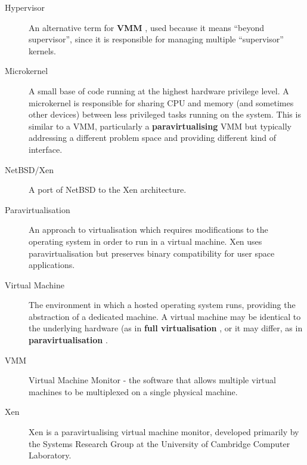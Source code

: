 \documentclass[11pt,twoside,final,openright]{xenstyle}
\begin{document}
{\begin{description}
\item[Hypervisor]          An alternative term for { \bf VMM }, used
                           because it means ``beyond supervisor'',
                           since it is responsible for managing multiple
                           ``supervisor'' kernels.

\item[Microkernel]         A small base of code running at the highest
                           hardware privilege level.  A microkernel is
                           responsible for sharing CPU and memory (and
                           sometimes other devices) between less
                           privileged tasks running on the system.
                           This is similar to a VMM, particularly a
                           {\bf paravirtualising} VMM but typically
                           addressing a different problem space and
                           providing different kind of interface.

\item[NetBSD/Xen]          A port of NetBSD to the Xen architecture.

\item[Paravirtualisation]  An approach to virtualisation which requires
                           modifications to the operating system in
                           order to run in a virtual machine.  Xen
                           uses paravirtualisation but preserves
                           binary compatibility for user space
                           applications.

\item[Virtual Machine]     The environment in which a hosted operating
                           system runs, providing the abstraction of a
                           dedicated machine.  A virtual machine may
                           be identical to the underlying hardware (as
                           in { \bf full virtualisation }, or it may
                           differ, as in { \bf paravirtualisation }.

\item[VMM]                 Virtual Machine Monitor - the software that
                           allows multiple virtual machines to be
                           multiplexed on a single physical machine.

\item[Xen]                 Xen is a paravirtualising virtual machine
                           monitor, developed primarily by the
                           Systems Research Group at the University
                           of Cambridge Computer Laboratory.


\end{description}}
\end{document}

